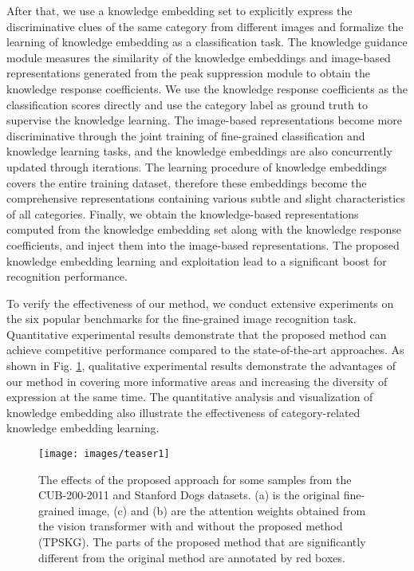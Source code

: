 \documentclass[5p,twocolumn]{elsarticle}
\begin{document}
After that, we use a knowledge embedding set to explicitly express the discriminative clues of the same category from different images and formalize the learning of knowledge embedding as a classification task. The knowledge guidance module measures the similarity of the knowledge embeddings and image-based representations generated from the peak suppression module to obtain the knowledge response coefficients. We use the knowledge response coefficients as the classification scores directly and use the category label as ground truth to supervise the knowledge learning. The image-based representations become more discriminative through the joint training of fine-grained classification and knowledge learning tasks, and the knowledge embeddings are also concurrently updated through iterations. The learning procedure of knowledge embeddings covers the entire training dataset, therefore these embeddings become the comprehensive representations containing various subtle and slight characteristics of all categories. Finally, we obtain the knowledge-based representations computed from the knowledge embedding set along with the knowledge response coefficients, and inject them into the image-based representations. The proposed knowledge embedding learning and exploitation lead to a significant boost for recognition performance.

To verify the effectiveness of our method, we conduct extensive experiments on the six popular benchmarks for the fine-grained image recognition task. Quantitative experimental results demonstrate that the proposed method can achieve competitive performance compared to the state-of-the-art approaches. As shown in Fig. \ref{fig:teaser}, qualitative experimental results demonstrate the advantages of our method in covering more informative areas and increasing the diversity of expression at the same time. The quantitative analysis and visualization of knowledge embedding also illustrate the effectiveness of category-related knowledge embedding learning.

\begin{figure}
\centering
 \texttt{[image: images/teaser1]}
  \caption{The effects of the proposed approach for some samples from the CUB-200-2011 and Stanford Dogs datasets. (a) is the original fine-grained image, (c) and (b) are the attention weights obtained from the vision transformer with and without the proposed method (TPSKG). The parts of the proposed method that are significantly different from the original method are annotated by red boxes.}
  \label{fig:teaser}
\end{figure}
\end{document}
